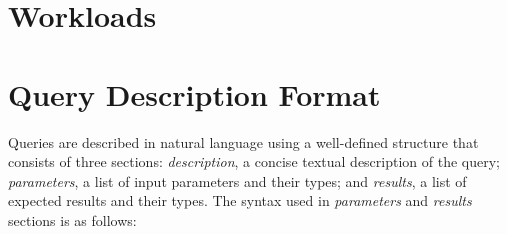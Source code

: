
\section{Workloads}\label{section:workloads}

\section{Query Description Format}
\label{sub:queries_structure}
Queries are described in natural language using a well-defined structure that consists of three sections:
\textit{description}, a concise textual description of the query; 
\textit{parameters}, a list of input parameters and their types;
and \textit{results}, a list of expected results and their types.
The syntax used in \textit{parameters} and \textit{results} sections is as follows:

